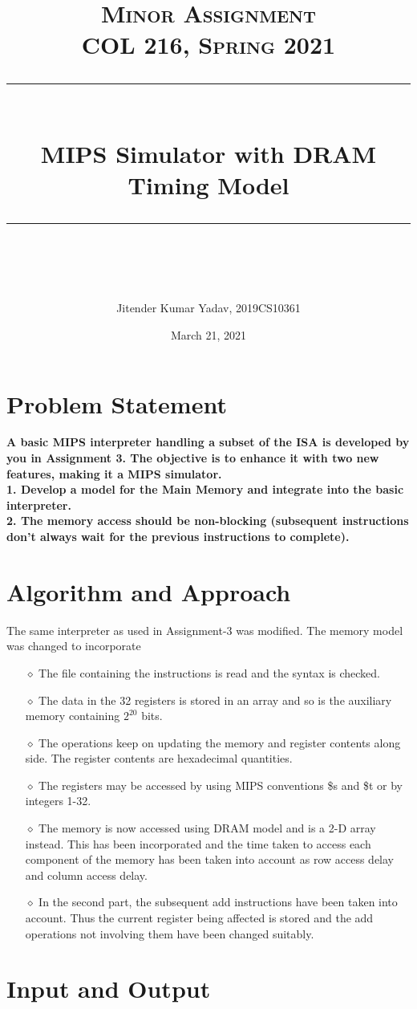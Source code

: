 \documentclass{article} %
\title{
\normalfont \large
\textsc{Minor Assignment
\vspace{10pt}
\\COL 216, Spring 2021} \\
[10pt] 
\rule{\linewidth}{0.5pt} \\[6pt] 
\Large MIPS Simulator with DRAM Timing Model  \\
\rule{\linewidth}{2pt}  \\[10pt]
}
\author{Jitender Kumar Yadav, 2019CS10361}
\date{\normalsize March 21, 2021}
\begin{document}
\maketitle
\section{Problem Statement}
\textbf{A basic MIPS interpreter handling a subset of the ISA is developed by you in Assignment 3. The  objective is to enhance it with two new features, making it a MIPS simulator.
\\1. Develop a model for the Main Memory and integrate into the basic interpreter.
\\2. The memory access should be non-blocking (subsequent instructions don’t always wait for the previous instructions to complete).
}

\section{Algorithm and Approach}
The same interpreter as used in Assignment-3 was modified. The memory model was changed to incorporate
\begin{itemize}
    \item[$\diamond$] The file containing the instructions is read and the syntax is checked.
    \item[$\diamond$] The data in the 32 registers is stored in an array and so is the auxiliary memory containing $2^{20}$ bits.
    \item[$\diamond$] The operations keep on updating the memory and register contents along side. The register contents are hexadecimal quantities.
    \item[$\diamond$] The registers may be accessed by using MIPS conventions \$s and \$t or by integers 1-32.
    \item[$\diamond$] The memory is now accessed using DRAM model and is a 2-D array instead. This has been incorporated and the time taken to access each component of the memory has been taken into account as row access delay and column access delay.
    \item[$\diamond$] In the second part, the subsequent add instructions have been taken into account. Thus the current register being affected is stored and the add operations not involving them have been changed suitably.
\end{itemize}

\section{Input and Output}
\end{document}
